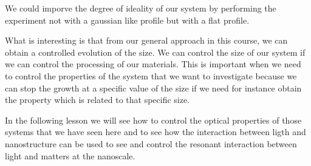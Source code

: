 \documentclass[../main/main.tex]{subfiles}
\begin{document}
We could imporve the degree of ideality of our system by performing the experiment not with a gaussian like profile but with a flat profile.

What is interesting is that from our general approach in this course, we can obtain a controlled evolution of the size. We can control the size of our system if we can control the processing of our materials. This is important when we need to control the properties of the system that we want to investigate because we can stop the growth at a specific value of the size if we need for instance obtain the property which is related to that specific size.

In the following lesson we will see how to control the optical properties of those systems that we have seen here and to see how the interaction between ligth and nanostructure can be used to see and control the resonant interaction between light and matters at the nanoscale.




\clearpage
\end{document}

